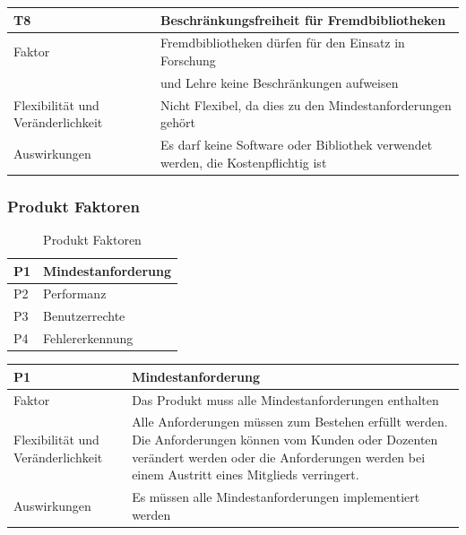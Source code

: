 \documentclass[fontsize=12pt,paper=a4,twoside]{scrartcl}
\begin{document}
\begin{table}[H]
\begin{tabular}{|p{3cm}|p{12cm}|}\hline
T8 & Beschränkungsfreiheit für Fremdbibliotheken\\ \hline
Faktor & Fremdbibliotheken dürfen für den Einsatz in Forschung\\
& und Lehre keine Beschränkungen aufweisen \\ \hline
Flexibilität und Veränderlichkeit & Nicht Flexibel, da dies zu den Mindestanforderungen gehört\\ \hline
Auswirkungen & Es darf keine Software oder Bibliothek verwendet werden, die Kostenpflichtig ist \\ \hline
\end{tabular}
\end{table}

\subsubsection{Produkt Faktoren}
\label{sec:produktfaktoren}

\begin{table}[H]
\centering
\caption{Produkt Faktoren}
\begin{tabular}{|l|l|} \hline
P1 & Mindestanforderung \\ \hline
P2 &  Performanz\\ \hline
P3 &  Benutzerrechte \\ \hline
P4 &  Fehlererkennung \\ \hline
\end{tabular}
\end{table}

\begin{table}[H]
\begin{tabular}{|p{3cm}|p{12cm}|}\hline
P1 & Mindestanforderung \\ \hline
Faktor & Das Produkt muss alle Mindestanforderungen enthalten\\ \hline
Flexibilität und Veränderlichkeit & Alle Anforderungen müssen zum Bestehen erfüllt werden. Die Anforderungen können vom Kunden oder Dozenten verändert werden oder die Anforderungen werden bei einem Austritt eines Mitglieds verringert.\\ \hline
Auswirkungen & Es müssen alle Mindestanforderungen implementiert werden \\ \hline
\end{tabular}
\end{table}
\end{document}
